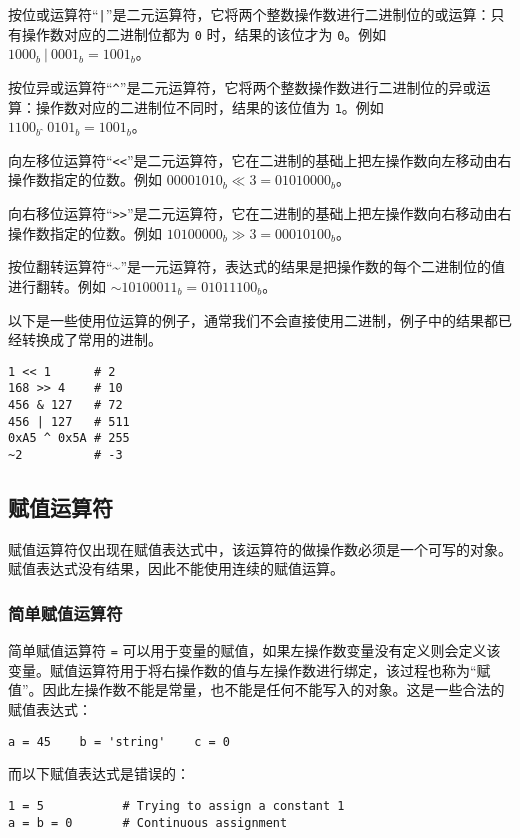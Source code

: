 按位或运算符``\texttt{|}''是二元运算符，它将两个整数操作数进行二进制位的或运算：只有操作数对应的二进制位都为 \texttt{0} 时，结果的该位才为 \texttt{0}。例如 $1000_b\ |\ 0001_b = 1001_b$。

按位异或运算符``\texttt{\textasciicircum}''是二元运算符，它将两个整数操作数进行二进制位的异或运算：操作数对应的二进制位不同时，结果的该位值为 \texttt{1}。例如 $1100_b\ \hat{}\ 0101_b = 1001_b$。

向左移位运算符``\texttt{<<}''是二元运算符，它在二进制的基础上把左操作数向左移动由右操作数指定的位数。例如 $00001010_b \ll 3 = 01010000_b$。

向右移位运算符``\texttt{>>}''是二元运算符，它在二进制的基础上把左操作数向右移动由右操作数指定的位数。例如 $10100000_b \gg 3 = 00010100_b$。

按位翻转运算符``\textasciitilde''是一元运算符，表达式的结果是把操作数的每个二进制位的值进行翻转。例如 $\mathtt{\sim}10100011_b = 01011100_b$。

以下是一些使用位运算的例子，通常我们不会直接使用二进制，例子中的结果都已经转换成了常用的进制。
\begin{lstlisting}[language=berry, numbers=none]
1 << 1      # 2
168 >> 4    # 10
456 & 127   # 72
456 | 127   # 511
0xA5 ^ 0x5A # 255
~2          # -3
\end{lstlisting}

\subsection{赋值运算符} \label{section::assign_operator}

赋值运算符仅出现在赋值表达式中，该运算符的做操作数必须是一个可写的对象。赋值表达式没有结果，因此不能使用连续的赋值运算。

\subsubsection{简单赋值运算符}

简单赋值运算符 \texttt{=} 可以用于变量的赋值，如果左操作数变量没有定义则会定义该变量。赋值运算符用于将右操作数的值与左操作数进行绑定，该过程也称为“赋值”。因此左操作数不能是常量，也不能是任何不能写入的对象。这是一些合法的赋值表达式：
\begin{lstlisting}[language=berry, numbers=none]
a = 45    b = 'string'    c = 0
\end{lstlisting}
而以下赋值表达式是错误的：
\begin{lstlisting}[language=berry, numbers=none]
1 = 5           # Trying to assign a constant 1
a = b = 0       # Continuous assignment
\end{lstlisting}

